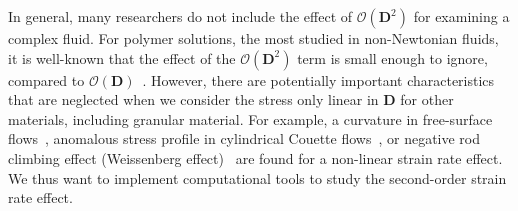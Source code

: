 \par
In general, many researchers do not include the effect of $\mathcal{O}\left( \bm{D}^2 \right)$ for examining a complex fluid. For polymer solutions, the most studied in non-Newtonian fluids, it is well-known that the effect of the $\mathcal{O}\left( \bm{D}^2 \right)$ term is small enough to ignore, compared to  $\mathcal{O}\left( \bm{D} \right)$~\cite{bird_dynamics_1987}. However, there are potentially important characteristics that are neglected when we consider the stress only linear in $\boldsymbol{D}$ for other materials, including granular material. For example, a curvature in free-surface flows~\cite{couturier_suspensions_2011}, anomalous stress profile in cylindrical Couette flows~\cite{krishnaraj_dilation-driven_2016}, or negative rod climbing effect (Weissenberg effect)~\cite{boyer_dense_2011} are found for a non-linear strain rate effect. We thus want to implement computational tools to study the second-order strain rate effect.




